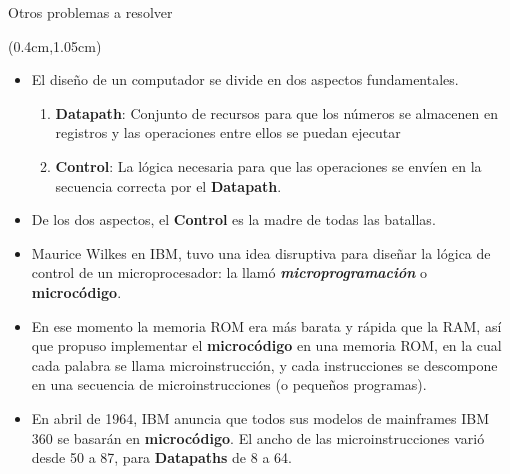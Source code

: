 \documentclass[table,dvipsnames,aspectratio=169]{beamer}
\begin{document}
\begin{frame}{Otros problemas a resolver}
 \begin{textblock*}{\textwidth}(0.4cm,1.05cm)
  \begin{itemize} [<+->] \justifying
   \item El diseño de un computador se divide en dos \textcolor{furfiBlue}{aspectos fundamentales}.
   \begin{enumerate}
    \item \textbf{Datapath}: Conjunto de recursos para que los números se almacenen en registros y las operaciones entre ellos se puedan ejecutar
    \item \textbf{Control}: La lógica necesaria para que las operaciones se envíen en la secuencia correcta por el \textbf{Datapath}.
   \end{enumerate}
   \item \textcolor{furfiGreen}{De los dos aspectos, el \textbf{Control} es la madre de todas las batallas.}
   \item Maurice Wilkes en IBM, tuvo una idea disruptiva para diseñar la lógica de control de un microprocesador: \textcolor{furfiBlue}{la llamó \textbf{\textit{microprogramación}} o \textbf{microcódigo}}.
   \item {\footnotesize En ese momento la memoria ROM era más barata y rápida que la RAM, así que propuso implementar el \textbf{microcódigo} en una memoria ROM, en la cual cada palabra se llama microinstrucción, y cada instrucciones se descompone en una secuencia de microinstrucciones (o pequeños programas).}
   \item En abril de 1964, IBM anuncia que todos sus modelos de mainframes IBM 360 \textcolor{furfiBlue}{se basarán en \textbf{microcódigo}}. {\footnotesize El ancho de las microinstrucciones varió desde \SI{50}{\bit} a \SI{87}{\bit}, para \textbf{Datapaths} de 8 a \SI{64}{\bit}.}
  \end{itemize}
 \end{textblock*}
\end{frame}
\end{document}
